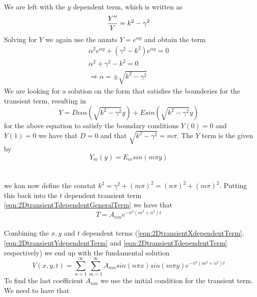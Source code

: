 \documentclass{article}
\begin{document}
\\
We are left with the $y$ dependent term, which is written as 
\begin{subequations}
\begin{equation}
\frac{Y''}{Y} = k^2 - \gamma^2\\
\end{equation}
\end{subequations}
Solving for $Y$ we again use the anzats $Y=e^{\alpha y}$ and obtain the term
\begin{subequations}
\begin{eqnarray}
\alpha^2 e^{\alpha y} + (\gamma^2 - k^2)e^{\alpha y} = 0 \\
\alpha^2 + \gamma^2 - k^2 = 0 \\
\Rightarrow \alpha = \pm \sqrt{k^2 - \gamma^2} 
\end{eqnarray}
\end{subequations}
We are looking for a solution on the form that satisfies the bounderies for the transient term, resulting in
\begin{equation}
Y = Dcos(\sqrt{k^2 - \gamma^2}y) + Esin(\sqrt{k^2 - \gamma^2}y)
\end{equation}
for the above equation to satisfy the boundary conditions $Y(0) = 0$ and $Y(1) = 0$ we have that $D = 0$ and that $\sqrt{k^2 - \gamma^2} = m\pi$.
The $Y$ term is the given by
\begin{equation}
Y_m(y) = E_msin(m\pi y)
\label{eqn:2DtransientYdependentTerm}
\end{equation}
\\
\\
we kan now define the constat $k^2 = \gamma^2 + (m\pi)^2 = (n\pi)^2 + (m\pi)^2$. Putting this back into the $t$ dependent transient term \ref{eqn:2DtransientTdependentGeneralTerm} we have that 
\begin{equation}
T = A_{nm}e^{-\pi^2(m^2+n^2)t}
\label{eqn:2DtransientTdependentTerm}
\end{equation}
\\
Combining the $x,y$ and $t$ dependent terms (\ref{eqn:2DtransientXdependentTerm}, \ref{eqn:2DtransientYdependentTerm} and \ref{eqn:2DtransientTdependentTerm} respectively) we end up with the fundamental solution
\begin{equation}
V(x,y,t) = \sum_{n=1}^{\infty} \sum_{m=1}^{\infty} A_{mn}sin(n\pi x)sin(m\pi y)e^{-\pi^2(m^2+n^2)t}
\end{equation}
To find the last coefficient $A_{nm}$ we use the initial condition for the transient term. We need to have that
\end{document}
